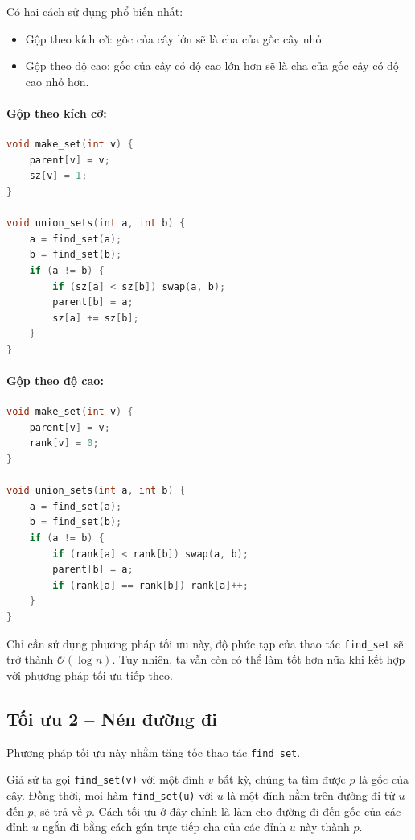 Có hai cách sử dụng phổ biến nhất:
\begin{itemize}
    \item Gộp theo kích cỡ: gốc của cây lớn sẽ là cha của gốc cây nhỏ.
    \item Gộp theo độ cao: gốc của cây có độ cao lớn hơn sẽ là cha của gốc cây có độ cao nhỏ hơn.
\end{itemize}

\paragraph{Gộp theo kích cỡ:}
\begin{lstlisting}[language=C++]
void make_set(int v) {
    parent[v] = v;
    sz[v] = 1;
}

void union_sets(int a, int b) {
    a = find_set(a);
    b = find_set(b);
    if (a != b) {
        if (sz[a] < sz[b]) swap(a, b);
        parent[b] = a;
        sz[a] += sz[b];
    }
}
\end{lstlisting}

\paragraph{Gộp theo độ cao:}
\begin{lstlisting}[language=C++]
void make_set(int v) {
    parent[v] = v;
    rank[v] = 0;
}

void union_sets(int a, int b) {
    a = find_set(a);
    b = find_set(b);
    if (a != b) {
        if (rank[a] < rank[b]) swap(a, b);
        parent[b] = a;
        if (rank[a] == rank[b]) rank[a]++;
    }
}
\end{lstlisting}

Chỉ cần sử dụng phương pháp tối ưu này, độ phức tạp của thao tác \texttt{find\_set} sẽ trở thành $\mathcal{O}(\log n)$. Tuy nhiên, ta vẫn còn có thể làm tốt hơn nữa khi kết hợp với phương pháp tối ưu tiếp theo.

\subsection*{Tối ưu 2 -- Nén đường đi}

Phương pháp tối ưu này nhằm tăng tốc thao tác \texttt{find\_set}.

Giả sử ta gọi \texttt{find\_set(v)} với một đỉnh $v$ bất kỳ, chúng ta tìm được $p$ là gốc của cây. Đồng thời, mọi hàm \texttt{find\_set(u)} với $u$ là một đỉnh nằm trên đường đi từ $u$ đến $p$, sẽ trả về $p$. Cách tối ưu ở đây chính là làm cho đường đi đến gốc của các đỉnh $u$ ngắn đi bằng cách gán trực tiếp cha của các đỉnh $u$ này thành $p$.

